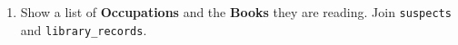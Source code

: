 \documentclass[12pt,a4paper]{article}
\begin{document}
\begin{enumerate}
    \item Show a list of \textbf{Occupations} and the \textbf{Books} they are reading. Join \texttt{suspects} and \texttt{library\_records}.







\end{enumerate}
\end{document}
